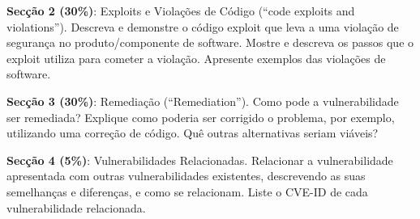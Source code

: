 \documentclass{article}
\begin{document}
\medskip

\noindent
\textbf{Secção 2 (30\%)}: Exploits e Violações de Código (``code
exploits and violations''). Descreva e demonstre o código exploit que
leva a uma violação de segurança no produto/componente de
software. Mostre e descreva os passos que o exploit utiliza para
cometer a violação. Apresente exemplos das violações de software.

\begin{center}
\setlength{\fboxrule}{1.5pt}
\end{center}


\noindent
\textbf{Secção 3 (30\%)}: Remediação (``Remediation''). Como pode a vulnerabilidade ser remediada? Explique
como poderia ser corrigido o problema, por exemplo, utilizando uma correção de
código. Quê outras alternativas seriam viáveis?


\begin{center}
\setlength{\fboxrule}{1.5pt}
\end{center} 


\noindent
\textbf{Secção 4 (5\%)}: Vulnerabilidades Relacionadas. Relacionar a vulnerabilidade
apresentada com outras vulnerabilidades existentes, descrevendo as suas semelhanças
e diferenças, e como se relacionam. Liste o CVE-ID de cada vulnerabilidade
relacionada.
\end{document}
